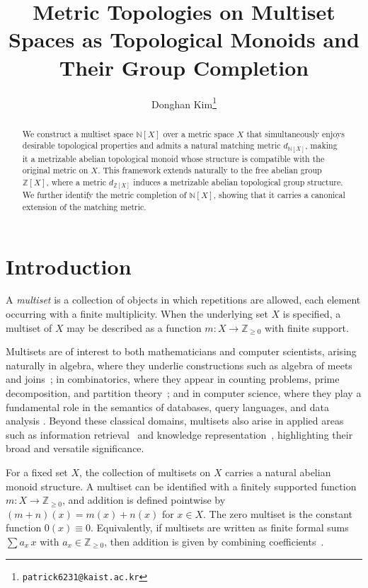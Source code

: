 \documentclass[10pt,a4paper]{article}
\title{Metric Topologies on Multiset Spaces as Topological Monoids and Their Group Completion}
\author[1]{Donghan Kim\thanks{\texttt{patrick6231@kaist.ac.kr}}}
\affil[1]{Department of Mathematical Sciences, KAIST, South Korea}
\date{}
\theoremstyle{definition}
\newcommand{\Zplus}{\mathbb{Z}_{\geq 0}}
\newcommand{\Z}{\mathbb{Z}}
\newcommand{\N}{\mathbb{N}}
\begin{document}
\maketitle

\begin{abstract}
We construct a multiset space $\N[X]$ over a metric space $X$ that simultaneously enjoys desirable topological properties and admits a natural matching metric $d_{\N[X]}$, making it a metrizable abelian topological monoid whose structure is compatible with the original metric on $X$.  
This framework extends naturally to the free abelian group $\Z[X]$, where a metric $d_{\Z[X]}$ induces a metrizable abelian topological group structure.  
We further identify the metric completion of $\N[X]$, showing that it carries a canonical extension of the matching metric.
\end{abstract}




\section{Introduction}
A \emph{multiset} is a collection of objects in which repetitions are
allowed, each element occurring with a finite multiplicity.  
When the underlying set $X$ is specified, a multiset of $X$ may be described as
a function $m: X \to \Zplus$ with finite support.  

Multisets are of interest to both mathematicians and computer scientists,
arising naturally in algebra, where they underlie constructions such as algebra of meets and joins~\cite{brink1987some}; in combinatorics,
where they appear in counting problems, prime decomposition, and partition
theory~\cite{aigner2012combinatorial,anderson2002combinatorics,stanley2011enumerative};
and in computer science, where they play a fundamental role in the semantics of
databases, query languages, and data analysis
\cite{grumbach1993towards,libkin1994some,libkin1995representation,singh2007overview}.
Beyond these classical domains, multisets also arise in applied areas such as
information retrieval~\cite{miyamoto2000rough} and knowledge representation~\cite{sheremet2024multiset}, highlighting their broad
and versatile significance.

For a fixed set $X$, the collection of multisets on $X$ carries a natural
abelian monoid structure. A multiset can be identified with a finitely
supported function $m: X \to \Zplus$, and addition is defined pointwise by
\((m+n)(x)=m(x)+n(x)\) for $x \in X$.  
The zero multiset is the constant function $0(x)\equiv 0$.  
Equivalently, if multisets are written as finite formal sums
\(\sum a_x\,x\) with $a_x\in\Zplus$, then addition is given by combining
coefficients~\cite{wildberger2003new}.
\end{document}
